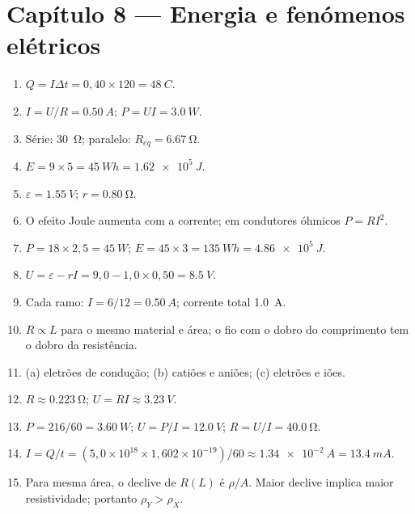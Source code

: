 \documentclass[11pt,a4paper,oneside]{book}
\begin{document}
\section*{Capítulo 8 — Energia e fenómenos elétricos}
\begin{enumerate}
  \item $Q=I\Delta t=0{,}40\times120=\SI{48}{C}$.
  \item $I=U/R=\SI{0.50}{A}$; $P=UI=\SI{3.0}{W}$.
  \item Série: \SI{30}{\ohm}; paralelo: $R_{eq}=\SI{6.67}{\ohm}$.
  \item $E=9\times5=\SI{45}{Wh}=\SI{1.62e5}{J}$.
  \item $\varepsilon=\SI{1.55}{V}$; $r=\SI{0.80}{\ohm}$.
  \item O efeito Joule aumenta com a corrente; em condutores óhmicos $P=RI^2$.
  \item $P=18\times2{,}5=\SI{45}{W}$; $E=45\times3=\SI{135}{Wh}=\SI{4.86e5}{J}$.
  \item $U=\varepsilon-rI=9{,}0-1{,}0\times0{,}50=\SI{8.5}{V}$.
  \item Cada ramo: $I=6/12=\SI{0.50}{A}$; corrente total \SI{1.0}{A}.
  \item $R\propto L$ para o mesmo material e área; o fio com o dobro do comprimento tem o dobro da resistência.
  \item (a) eletrões de condução; (b) catiões e aniões; (c) eletrões e iões.
  \item $R\approx\SI{0.223}{\ohm}$; $U=RI\approx\SI{3.23}{V}$.
  \item $P=216/60=\SI{3.60}{W}$; $U=P/I=\SI{12.0}{V}$; $R=U/I=\SI{40.0}{\ohm}$.
  \item $I=Q/t=(5{,}0\times10^{18}\times1{,}602\times10^{-19})/60\approx\SI{1.34e-2}{A}=\SI{13.4}{mA}$.
  \item Para mesma área, o declive de $R(L)$ é $\rho/A$. Maior declive implica maior resistividade; portanto $\rho_Y>\rho_X$.
\end{enumerate}
\end{document}
